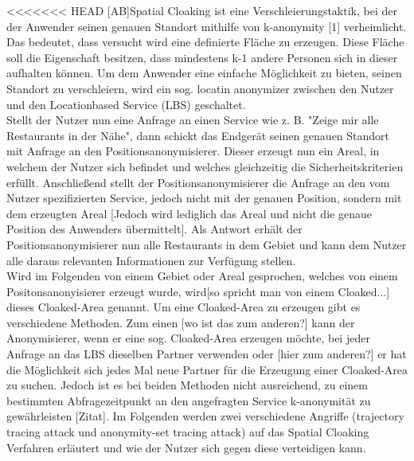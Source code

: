 <<<<<<< HEAD
[AB]Spatial Cloaking ist eine Verschleierungstaktik, bei der der Anwender seinen genauen Standort mithilfe von k-anonymity [1] verheimlicht. Das bedeutet, dass versucht wird eine definierte Fläche zu erzeugen. Diese Fläche soll die Eigenschaft besitzen, dass mindestens k-1 andere Personen sich in dieser aufhalten können. Um dem Anwender eine einfache Möglichkeit zu bieten, seinen Standort zu verschleiern, wird ein sog. locatin anonymizer zwischen den Nutzer und den Locationbased Service (LBS) geschaltet. \\ Stellt der Nutzer nun eine Anfrage an einen Service wie z. B. "Zeige mir alle Restaurants in der Nähe", dann schickt das Endgerät seinen genauen Standort mit Anfrage an den Positionsanonymisierer. Dieser erzeugt nun ein Areal, in welchem der Nutzer sich befindet und welches gleichzeitig die Sicherheitskriterien erfüllt. Anschließend stellt der Positionsanonymisierer die Anfrage an den vom Nutzer spezifizierten Service, jedoch nicht mit der genauen Position, sondern mit dem erzeugten Areal [Jedoch wird lediglich das Areal und nicht die genaue Position des Anwenders übermittelt]. Als Antwort erhält der Positionsanonymisierer nun alle Restaurants in dem Gebiet und kann dem Nutzer alle daraus relevanten Informationen zur Verfügung stellen.\\ Wird im Folgenden von einem Gebiet oder Areal gesprochen, welches von einem Positonsanonyisierer erzeugt wurde, wird[so spricht man von einem Cloaked...] dieses Cloaked-Area genannt. Um eine Cloaked-Area zu erzeugen gibt es verschiedene Methoden. Zum einen [wo ist das zum anderen?] kann der Anonymisierer, wenn er eine sog. Cloaked-Area erzeugen möchte, bei jeder Anfrage an das LBS dieselben Partner verwenden oder [hier zum anderen?] er hat die Möglichkeit sich jedes Mal neue Partner für die Erzeugung einer Cloaked-Area zu suchen. Jedoch ist es bei beiden Methoden nicht ausreichend, zu einem bestimmten Abfragezeitpunkt an den angefragten Service k-anonymität zu gewährleisten [Zitat]. Im Folgenden werden zwei verschiedene Angriffe (trajectory tracing attack und anonymity-set tracing attack) auf das Spatial Cloaking Verfahren erläutert und wie der Nutzer sich gegen diese verteidigen kann. 
